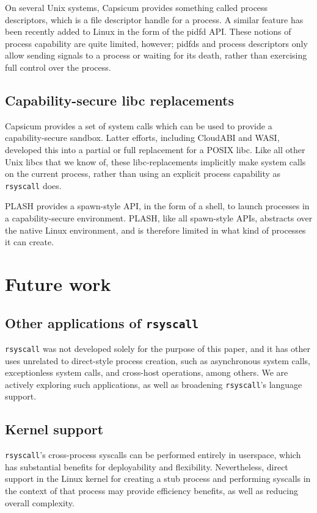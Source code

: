 \documentclass[letterpaper,twocolumn,10pt]{article}
\begin{document}
On several Unix systems,
Capsicum provides something called process descriptors,
which is a file descriptor handle for a process.\cite{capsicum}
A similar feature has been recently added to Linux in the form of the pidfd API.\cite{pidfd}
These notions of process capability are quite limited, however;
pidfds and process descriptors only allow sending signals to a process or waiting for its death,
rather than exercising full control over the process.
\subsection{Capability-secure libc replacements}
Capsicum provides a set of system calls
which can be used to provide a capability-secure sandbox.\cite{capsicum}
Latter efforts, including CloudABI and WASI,
developed this into a partial or full replacement for a POSIX libc.\cite{oblivious}\cite{cloudabi}\cite{wasi}
Like all other Unix libcs that we know of,
these libc-replacements implicitly make system calls on the current process,
rather than using an explicit process capability as \texttt{rsyscall} does.

PLASH provides a spawn-style API, in the form of a shell,
to launch processes in a capability-secure environment.\cite{plash}
PLASH, like all spawn-style APIs, abstracts over the native Linux environment,
and is therefore limited in what kind of processes it can create.
\section{Future work}\label{future_work}
\subsection{Other applications of \texttt{rsyscall}}
\texttt{rsyscall} was not developed solely for the purpose of this paper,
and it has other uses unrelated to direct-style process creation,
such as asynchronous system calls, exceptionless system calls\cite{flexsc}, and cross-host operations, among others.
We are actively exploring such applications,
as well as broadening \texttt{rsyscall}'s language support.
\subsection{Kernel support}
\texttt{rsyscall}'s cross-process syscalls can be performed entirely in userspace,
which has substantial benefits for deployability and flexibility.
Nevertheless, direct support in the Linux kernel
for creating a stub process and performing syscalls in the context of that process
may provide efficiency benefits, as well as reducing overall complexity.
\end{document}

